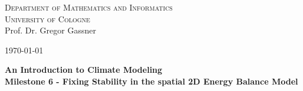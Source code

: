 \documentclass[10pt]{scrartcl}
\begin{document}
\begin{minipage}{.5\textwidth}
{\scshape Department of Mathematics and Informatics \\
University of Cologne\\}
\small Prof. Dr. Gregor Gassner \\
\end{minipage}
\hfill
\begin{minipage}{.3\textwidth}
\begin{flushright}
\today
\end{flushright}
\end{minipage}

\begin{center}
{\Large\bfseries
An Introduction to Climate Modeling}\\
\vspace{0.2cm}
{\bfseries Milestone 6 - Fixing Stability in the spatial 2D Energy Balance Model}
\end{center}
\end{document}
